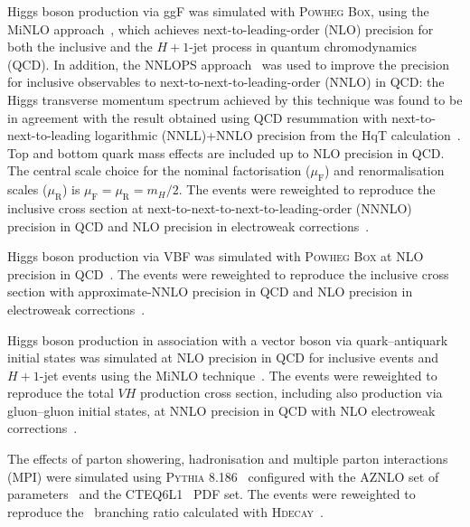Higgs boson production via ggF was simulated with \textsc{Powheg Box}, using the MiNLO
approach~\cite{Hamilton:2015nsa}, which achieves next-to-leading-order (NLO) precision for both 
the inclusive and the $H + 1$-jet process in quantum chromodynamics (QCD).
In addition, the NNLOPS approach~\cite{Hamilton:2013fea} was used to improve the precision for
inclusive observables to next-to-next-to-leading-order (NNLO) in QCD: 
the Higgs transverse momentum spectrum achieved by 
this technique was found to be in agreement 
with the result obtained using QCD  
resummation with next-to-next-to-leading logarithmic (NNLL)+NNLO precision 
from the HqT calculation~\cite{Bozzi:2005wk, deFlorian:2011xf}. Top
and bottom quark mass effects are included up to NLO precision in QCD. The central scale
choice for the nominal factorisation ($\mu_\mathrm{F}$) and 
renormalisation scales ($\mu_\mathrm{R}$) is $\mu_\mathrm{F} = \mu_\mathrm{R} = m_H/2$. 
The events were reweighted to reproduce the inclusive cross section
at next-to-next-to-next-to-leading-order (NNNLO) precision in QCD and NLO precision in
electroweak corrections~\cite{Anastasiou:2015ema, Anastasiou:2016cez, Actis:2008ug, Anastasiou:2008tj, Butterworth:2015oua, deFlorian:2016spz}.

Higgs boson production via VBF was simulated with \textsc{Powheg Box} at NLO precision in QCD~\cite{Nason:2009ai}. 
The events were reweighted to reproduce the inclusive cross section with approximate-NNLO precision in QCD and NLO 
precision in electroweak corrections~\cite{Butterworth:2015oua, deFlorian:2016spz, Ciccolini:2007jr, Ciccolini:2007ec, Bolzoni:2010xr}. 

Higgs boson production in association with a vector boson via quark--antiquark initial states
was simulated at 
NLO precision in QCD for inclusive events and $H + 1$-jet events using the MiNLO technique~\cite{Hamilton:2012rf}. 
The events were reweighted to reproduce 
the total $VH$ production cross section, including also production via gluon--gluon initial states, at NNLO precision in QCD with NLO electroweak 
corrections~\cite{Butterworth:2015oua, deFlorian:2016spz, Brein:2003wg, Altenkamp:2012sx, Denner:2011id}. 


The effects of parton showering, hadronisation and multiple parton interactions (MPI) were
simulated using \textsc{Pythia 8.186}~\cite{Pythia8} configured with the AZNLO set of 
parameters~\cite{Aad:2014xaa} and the CTEQ6L1~\cite{cteq6l1} PDF set.
The events were reweighted to 
reproduce the \htoZg~branching ratio calculated with 
\textsc{Hdecay}~\cite{deFlorian:2016spz, Djouadi:1997yw, Djouadi:2006bz}.

